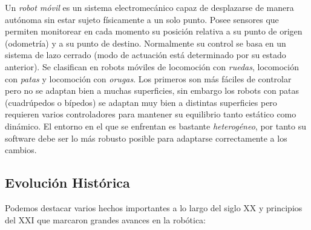 Un \textit{robot móvil} es un sistema electromecánico capaz de desplazarse de ma­nera autónoma sin estar sujeto físicamente a un solo punto\cite{robots-moviles-evolucion-estado-arte}. Posee sensores que permiten monitorear en cada momento su posición relativa a su punto de origen (odometría) y a su punto de destino. Normalmente su control se basa en un sistema de lazo cerrado (modo de actuación está determinado por su estado anterior). Se clasifican en robots móviles de locomoción con \textit{ruedas}, locomoción con \textit{patas} y locomoción con \textit{orugas}.  Los primeros son más fáciles de controlar pero no se adaptan bien a muchas superficies, sin embargo los robots con patas (cuadrúpedos o bípedos) se adaptan muy bien a distintas superficies pero requieren varios controladores para mantener su equilibrio tanto estático como dinámico. El entorno en el que se enfrentan es bastante \textit{heterogéneo}, por tanto su software debe ser lo más robusto posible para adaptarse correctamente a los cambios.\\




\subsection{Evolución Histórica}
\label{subsec:evolucion_historica}

Podemos destacar varios hechos importantes a lo largo del siglo XX y principios del XXI que 
marcaron grandes avances en la robótica:

